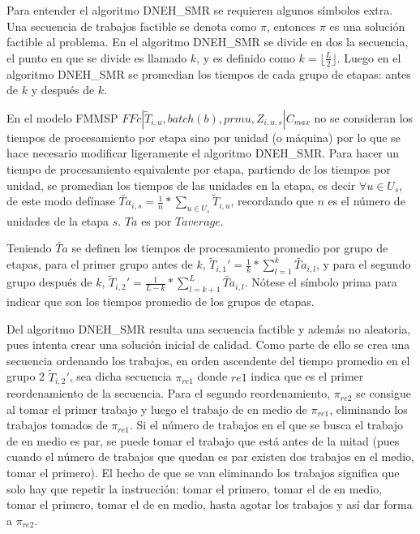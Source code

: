 \documentclass{article}
\def\notac_modelo{$FFc | \tilde{T}_{i, u}, batch(b), prmu, Z_{i, u, s} | C_{max}$}
\begin{document}
\vspace{\baselineskip}
Para entender el algoritmo DNEH\_SMR se requieren algunos símbolos extra. Una secuencia de trabajos factible se denota como $\pi$, entonces $\pi$ es una solución factible al problema. En el algoritmo DNEH\_SMR se divide en dos la secuencia, el punto en que se divide es llamado $k$, y es definido como $k = \lfloor\frac{L}{2}\rfloor$. Luego en el algoritmo DNEH\_SMR se promedian los tiempos de cada grupo de etapas: antes de $k$ y después de $k$. \autocite{algMNIG}

\vspace{\baselineskip}
En el modelo FMMSP \notac_modelo no se consideran los tiempos de procesamiento por etapa sino por unidad (o máquina) por lo que se hace necesario modificar ligeramente el algoritmo DNEH\_SMR. Para hacer un tiempo de procesamiento equivalente por etapa, partiendo de los tiempos por unidad, se promedian los tiempos de las unidades en la etapa, es decir $\forall u \in U_{s}$, de este modo defínase $\widetilde{Ta}_{i,s} = \frac{1}{n} *\sum_{u \in U_{s}} \widetilde{T}_{i,u}$, recordando que $n$ es el número de unidades de la etapa $s$. $Ta$ es por $T average$. 

\vspace{\baselineskip}
Teniendo $\widetilde{Ta}$ se definen los tiempos de procesamiento promedio por
grupo de etapas, para el primer grupo antes de $k$, $\widetilde{T}_{i,1}' = \frac{1}{k}*\sum_{l=1}^{k} \widetilde{Ta}_{i,l}$, y para el segundo grupo después de $k$, $\widetilde{T}_{i,2}' = \frac{1}{L-k}*\sum_{l = k+1}^{L} \widetilde{Ta}_{i,l}$. Nótese el símbolo prima para indicar que son los tiempos promedio de los grupos de etapas. \autocite{algMNIG}

\vspace{\baselineskip}
Del algoritmo DNEH\_SMR resulta una secuencia factible y además no aleatoria, pues intenta crear una solución inicial de calidad. Como parte de ello se crea una secuencia ordenando los trabajos, en orden ascendente del tiempo promedio en el grupo 2 $\widetilde{T}_{i,2}'$, sea dicha secuencia $\pi_{re1}$ donde $re1$ indica que es el primer reordenamiento de la secuencia. Para el segundo reordenamiento, $\pi_{re2}$ se consigue al tomar el primer trabajo y luego el trabajo de en medio de $\pi_{re1}$, eliminando los trabajos tomados de $\pi_{re1}$. Si el número de trabajos en el que se busca el trabajo de en medio es par, se puede tomar el trabajo que está antes de la mitad (pues cuando el número de trabajos que quedan es par existen dos trabajos en el medio, tomar el primero). El hecho de que se van eliminando los trabajos significa que solo hay que repetir la instrucción: tomar el primero, tomar el de en medio, tomar el primero, tomar el de en medio, hasta agotar los trabajos y así dar forma a $\pi_{re2}$. \autocite{algMNIG}
\end{document}
